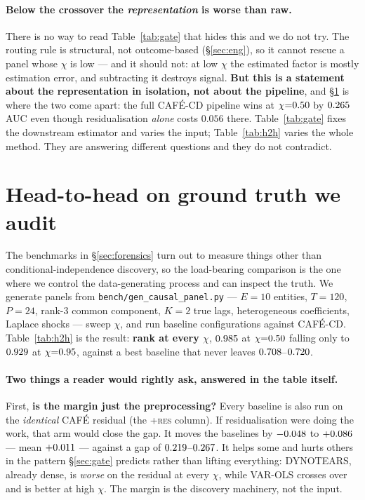 \documentclass[10pt,twocolumn]{article}
\newcommand{\cafe}{CAF\'E}
\DeclareRobustCommand{\cd}{\cafe{}\nobreakdash-CD}
\begin{document}
\paragraph{Below the crossover the \emph{representation} is worse than raw.} There is
no way to read Table~\ref{tab:gate} that hides this and we do not try. The routing rule
is structural, not outcome-based (\S\ref{sec:eng}), so it cannot rescue a panel whose
$\chi$ is low --- and it should not: at low $\chi$ the estimated factor is mostly
estimation error, and subtracting it destroys signal. \textbf{But this is a statement
about the representation in isolation, not about the pipeline}, and
\S\ref{sec:h2h} is where the two come apart: the full \cd{} pipeline wins at
$\chi{=}0.50$ by $0.265$ AUC even though residualisation \emph{alone} costs
$0.056$ there. Table~\ref{tab:gate} fixes the downstream estimator and varies the input;
Table~\ref{tab:h2h} varies the whole method. They are answering different questions and
they do not contradict.

\section{Head-to-head on ground truth we audit}\label{sec:h2h}
The benchmarks in \S\ref{sec:forensics} turn out to measure things other than
conditional-independence discovery, so the load-bearing comparison is the one where we
control the data-generating process and can inspect the truth. We generate panels from
\texttt{bench/gen\_causal\_panel.py} --- $E{=}10$ entities, $T{=}120$, $P{=}24$,
rank-3 common component, $K{=}2$ true lags, heterogeneous coefficients, Laplace shocks
--- sweep $\chi$, and run \HHnbase{} baseline configurations against \cd{}.
Table~\ref{tab:h2h} is the result: \textbf{rank \HHrank{} at every $\chi$},
$0.985$ at $\chi{=}0.50$ falling only to $0.929$ at $\chi{=}0.95$, against
a best baseline that never leaves $0.708$--$0.720$.



\paragraph{Two things a reader would rightly ask, answered in the table itself.}
First, \textbf{is the margin just the preprocessing?} Every baseline is also run on the
\emph{identical} \cafe{} residual (the \textsc{+res} column). If residualisation were
doing the work, that arm would close the gap. It moves the baselines by $-0.048$ to
$+0.086$ --- mean $+0.011$ --- against a gap of $0.219$--$0.267$. It helps
some and hurts others in the pattern \S\ref{sec:gate} predicts rather than lifting
everything: DYNOTEARS, already dense, is \emph{worse} on the residual at every $\chi$,
while VAR-OLS crosses over and is better at high $\chi$. The margin is the discovery
machinery, not the input.
\end{document}
